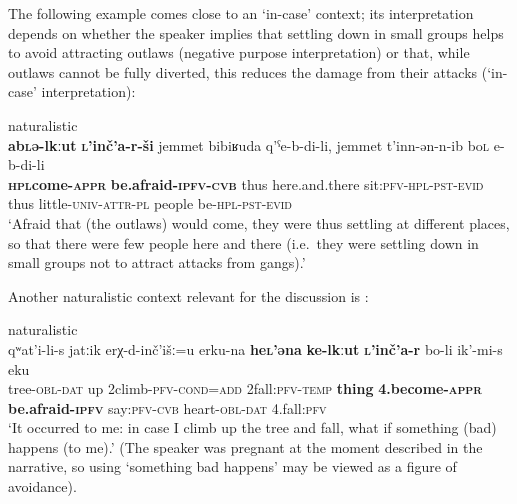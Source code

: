 \documentclass[output=paper,colorlinks,citecolor=brown]{langscibook}
\begin{document}
The following example comes close to an `in-case' context; its interpretation depends on whether the speaker implies that settling down in small groups helps to avoid attracting outlaws (negative purpose interpretation) or that, while outlaws cannot be fully diverted, this reduces the damage from their attacks (`in-case' interpretation):

\begin{exe} \ex \label{ex:DD28} \textnormal{naturalistic}\\
\gll \textbf{a{\textlangle}b{\textrangle}\textsc{l}ə-lkːut} \textbf{\textsc{l}'inč'a-r-ši} jemmet bibiʁuda q'ˁe-b-di-li, jemmet t'inn-ən-n-ib bo\textsc{l} e-b-di-li\\
{\textlangle}\textbf{\textsc{hpl}{\textrangle}come-\textsc{appr}} \textbf{be.afraid-\textsc{ipfv-cvb}} thus here.and.there sit:\textsc{pfv-hpl-pst-evid} thus little-\textsc{univ-attr-pl} people be-\textsc{hpl-pst-evid}\\
\glt `Afraid that (the outlaws) would come, they were thus settling at different places, so that there were few people here and there (i.e.\ they were settling down in small groups not to attract attacks from gangs).'
\end{exe}

 Another naturalistic context relevant for the discussion is :

\ea \label{ex:DD29} \textnormal{naturalistic} \\
\gll qʷat'i-li-s jatːik e{\textlangle}r{\textrangle}χ-d-inč'išː=u e{\textlangle}r{\textrangle}ku-na \textbf{he\textsc{l}'əna} \textbf{ke-lkːut} \textbf{\textsc{l}'inč'a-r} bo-li ik'-mi-s eku \\
tree-\textsc{obl-dat} up {\textlangle}2{\textrangle}climb-\textsc{pfv-cond=add} {\textlangle}2{\textrangle}fall:\textsc{pfv-temp} \textbf{thing} \textbf{4.become-\textsc{appr}} \textbf{be.afraid-\textsc{ipfv}} say:\textsc{pfv-cvb} heart-\textsc{obl-dat} 4.fall:\textsc{pfv} \\
\glt `It occurred to me: in case I climb up the tree and fall, what if something (bad) happens (to me).' (The speaker was pregnant at the moment described in the narrative, so using `something bad happens' may be viewed as a figure of avoidance).
\z
\end{document}
